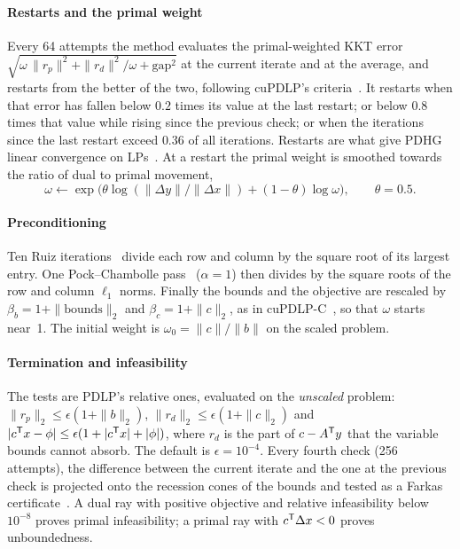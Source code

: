 \paragraph{Restarts and the primal weight}
Every 64 attempts the method evaluates the primal-weighted KKT error
$\sqrt{\omega\,\|r_p\|^2+\|r_d\|^2/\omega+\text{gap}^2}$ at the current iterate and at the
average, and restarts from the better of the two, following cuPDLP's criteria~\cite{lu2023cupdlp}.
It restarts when that error has fallen below $0.2$ times its value at the last restart; or below $0.8$
times that value while rising since the previous check; or when the iterations since the last restart
exceed $0.36$ of all iterations. Restarts are what give PDHG linear convergence on LPs~\cite{applegate2023}.
At a restart the primal weight is smoothed towards the ratio of dual to primal movement,
\begin{equation}\label{eq:omega}
  \omega \leftarrow \exp\bigl(\theta\log(\|\Delta y\|/\|\Delta x\|)+(1-\theta)\log\omega\bigr),\qquad \theta=0.5 .
\end{equation}

\paragraph{Preconditioning}
Ten Ruiz iterations~\cite{ruiz2001} divide each row and column by the square root of its largest
entry. One Pock--Chambolle pass~\cite{pock2011} ($\alpha=1$) then divides by the square roots of the
row and column $\ell_1$ norms. Finally the bounds and the objective are rescaled by
$\beta_b=1+\|\text{bounds}\|_2$ and $\beta_c=1+\|c\|_2$, as in cuPDLP-C~\cite{lu2023cupdlpc}, so that
$\omega$ starts near~1. The initial weight is $\omega_0=\|c\|/\|b\|$ on the scaled problem.

\paragraph{Termination and infeasibility}
The tests are PDLP's relative ones, evaluated on the \emph{unscaled} problem:
$\|r_p\|_2\le\epsilon(1+\|b\|_2)$, $\|r_d\|_2\le\epsilon(1+\|c\|_2)$ and
$|c^{\mathsf{T}} x-\phi|\le\epsilon(1+|c^{\mathsf{T}} x|+|\phi|)$, where $r_d$ is the part of $c-A^{\mathsf{T}} y$ that the variable
bounds cannot absorb. The default is $\epsilon=10^{-4}$. Every fourth check (256 attempts), the
difference between the current iterate and the one at the previous check is projected onto the
recession cones of the bounds and tested as a Farkas certificate~\cite{applegate2024}. A dual ray
with positive objective and relative infeasibility below $10^{-8}$ proves primal infeasibility; a
primal ray with $c^{\mathsf{T}}\Delta x<0$ proves unboundedness.

